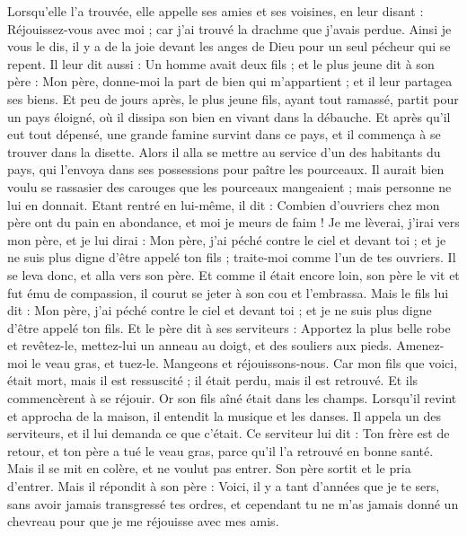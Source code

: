 \begin{multicols}{2}
Lorsqu’elle l’a trouvée, elle appelle ses amies et ses voisines, en leur disant : Réjouissez-vous avec moi ; car j'ai trouvé la drachme que j'avais perdue.
Ainsi je vous le dis, il y a de la joie devant les anges de Dieu pour un seul pécheur qui se repent.
Il leur dit aussi : Un homme avait deux fils ;
et le plus jeune dit à son père : Mon père, donne-moi la part de bien qui m'appartient ; et il leur partagea ses biens.
Et peu de jours après, le plus jeune fils, ayant tout ramassé, partit pour un pays éloigné, où il dissipa son bien en vivant dans la débauche.
Et après qu'il eut tout dépensé, une grande famine survint dans ce pays, et il commença à se trouver dans la disette.
Alors il alla se mettre au service d'un des habitants du pays, qui l'envoya dans ses possessions pour paître les pourceaux.
Il aurait bien voulu se rassasier des carouges que les pourceaux mangeaient ; mais personne ne lui en donnait.
Etant rentré en lui-même, il dit : Combien d’ouvriers chez mon père ont du pain en abondance, et moi je meurs de faim !
Je me lèverai, j’irai vers mon père, et je lui dirai : Mon père, j'ai péché contre le ciel et devant toi ;
et je ne suis plus digne d'être appelé ton fils ; traite-moi comme l'un de tes ouvriers.
Il se leva donc, et alla vers son père. Et comme il était encore loin, son père le vit et fut ému de compassion, il courut se jeter à son cou et l’embrassa.
Mais le fils lui dit : Mon père, j'ai péché contre le ciel et devant toi ; et je ne suis plus digne d'être appelé ton fils.
Et le père dit à ses serviteurs : Apportez la plus belle robe et revêtez-le, mettez-lui un anneau au doigt, et des souliers aux pieds.
Amenez-moi le veau gras, et tuez-le. Mangeons et réjouissons-nous.
Car mon fils que voici, était mort, mais il est ressuscité ; il était perdu, mais il est retrouvé. Et ils commencèrent à se réjouir.
Or son fils aîné était dans les champs. Lorsqu’il revint et approcha de la maison, il entendit la musique et les danses.
Il appela un des serviteurs, et il lui demanda ce que c'était.
Ce serviteur lui dit : Ton frère est de retour, et ton père a tué le veau gras, parce qu'il l'a retrouvé en bonne santé.
Mais il se mit en colère, et ne voulut pas entrer. Son père sortit et le pria d'entrer.
Mais il répondit à son père : Voici, il y a tant d'années que je te sers, sans avoir jamais transgressé tes ordres, et cependant tu ne m'as jamais donné un chevreau pour que je me réjouisse avec mes amis.

\end{multicols}
